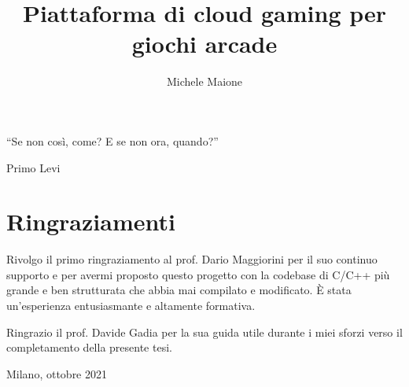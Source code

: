 \documentclass[openany]{book}
\title{Piattaforma di cloud gaming per giochi arcade}
\author{Michele Maione}
\newcounter{savepage}
\begin{document}


\frontmatter
{
	\raggedleft \large %
	``Se non così, come? E se non ora, quando?''
	
	\bigskip
	
	\textemdash Primo Levi\\
}

\chapter*{Ringraziamenti}
Rivolgo il primo ringraziamento al prof. Dario Maggiorini per il suo continuo supporto e per avermi proposto questo progetto con la codebase di C/C++ più grande e ben strutturata che abbia mai compilato e modificato. È stata un'esperienza entusiasmante e altamente formativa.

Ringrazio il prof. Davide Gadia per la sua guida utile durante i miei sforzi verso il completamento della presente tesi.

\begin{flushright}
	Milano, ottobre 2021
\end{flushright}




\newpage
\setcounter{tocdepth}{2}
\tableofcontents



\newpage
{}

\mainmatter






\appendix
\newpage
{}
\setcounter{page}{\thesavepage}

%
%
%

%
%


\backmatter
\printbibliography[nottype=misc,title={Bibliografia},heading=bibintoc]
\printbibliography[type=misc,title={Sitografia},heading=bibintoc]

\newpage
\listoffigures

\newpage
\listoftables

\newpage
{}


\end{document}
